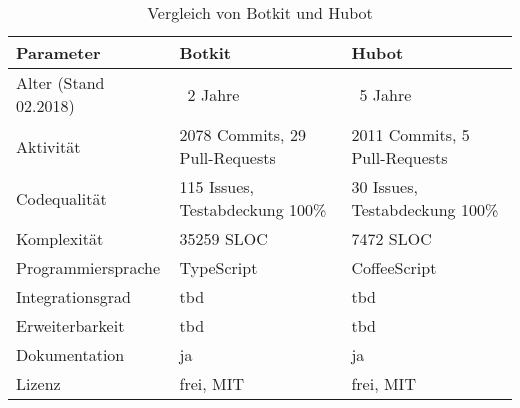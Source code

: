 \begin{table}[htbp]
    \centering
    \begin{tabularx}{\textwidth}{lXX}
        \hline
        \textbf{Parameter} & \textbf{Botkit} & \textbf{Hubot} \\
        \hline
        Alter (Stand 02.2018) & ~2 Jahre & ~5 Jahre \\
        \hline
        Aktivität & 2078 Commits, 29 Pull-Requests & 2011 Commits, 5 Pull-Requests \\
        \hline
        Codequalität & 115 Issues, Testabdeckung 100\% & 30 Issues, Testabdeckung 100\% \\
        \hline
        Komplexität & 35259 SLOC & 7472 SLOC\\
        \hline
        Programmiersprache & TypeScript & CoffeeScript\\
        \hline
        Integrationsgrad & tbd & tbd \\
        \hline
        Erweiterbarkeit & tbd & tbd \\
        \hline
        Dokumentation & ja & ja \\
        \hline
        Lizenz & frei, MIT & frei, MIT \\
    \end{tabularx}
    \caption{Vergleich von Botkit und Hubot}
    \label{tab:comparebotkithubot}
\end{table}


